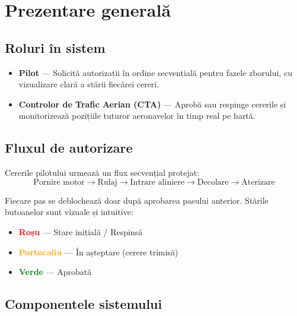 \documentclass[11pt,a4paper]{report}
\begin{document}
\section{Prezentare generală}

\subsection{Roluri în sistem}

\begin{itemize}
    \item \textbf{Pilot} — Solicită autorizații în ordine secvențială pentru fazele
    zborului, cu vizualizare clară a stării fiecărei cereri.
    \item \textbf{Controlor de Trafic Aerian (CTA)} — Aprobă sau respinge cererile
    și monitorizează pozițiile tuturor aeronavelor în timp real pe hartă.
\end{itemize}

\subsection{Fluxul de autorizare}

Cererile pilotului urmează un flux secvențial protejat:
\[
\text{Pornire motor} \rightarrow \text{Rulaj} \rightarrow \text{Intrare aliniere}
\rightarrow \text{Decolare} \rightarrow \text{Aterizare}
\]

Fiecare pas se deblochează doar după aprobarea pasului anterior.
Stările butoanelor sunt vizuale și intuitive:

\begin{itemize}
    \item \textcolor{red}{\textbf{Roșu}} — Stare inițială / Respinsă
    \item \textcolor{orange}{\textbf{Portocaliu}} — În așteptare (cerere trimisă)
    \item \textcolor{green}{\textbf{Verde}} — Aprobată
\end{itemize}

\subsection{Componentele sistemului}
\end{document}
